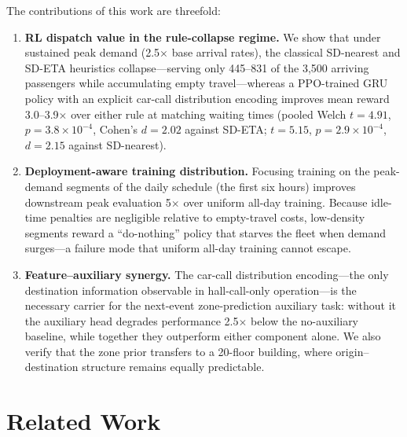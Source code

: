 \documentclass{IEEEcsmag}
\begin{document}
The contributions of this work are threefold:
\begin{enumerate}
    \item \textbf{RL dispatch value in the rule-collapse regime.}
    We show that under sustained peak demand (2.5$\times$ base
    arrival rates), the classical SD-nearest and SD-ETA heuristics
collapse---serving only 445--831 of the 3{,}500 arriving passengers
    while accumulating empty travel---whereas a PPO-trained GRU policy
    with an explicit car-call distribution encoding improves mean
    reward 3.0--3.9$\times$ over either rule at matching waiting times
    (pooled Welch
    $t = 4.91$, $p = 3.8\times10^{-4}$, Cohen's $d = 2.02$ against
    SD-ETA; $t = 5.15$, $p = 2.9\times10^{-4}$, $d = 2.15$ against
    SD-nearest).
    \item \textbf{Deployment-aware training distribution.} Focusing
    training on the peak-demand segments of the daily schedule (the
    first six hours) improves downstream peak evaluation 5$\times$
    over uniform all-day training. Because idle-time penalties are
    negligible relative to empty-travel costs, low-density segments
    reward a ``do-nothing'' policy that starves the fleet when demand
    surges---a failure mode that uniform all-day training cannot
    escape.
    \item \textbf{Feature--auxiliary synergy.} The car-call
    distribution encoding---the only destination information
    observable in hall-call-only operation---is the necessary
    carrier for the next-event zone-prediction auxiliary task:
    without it the auxiliary head degrades performance
    2.5$\times$ below the no-auxiliary baseline, while together they
    outperform either component alone. We also verify that the zone
    prior transfers to a 20-floor building, where origin--
    destination structure remains equally predictable.
\end{enumerate}

\section{Related Work}
\end{document}
